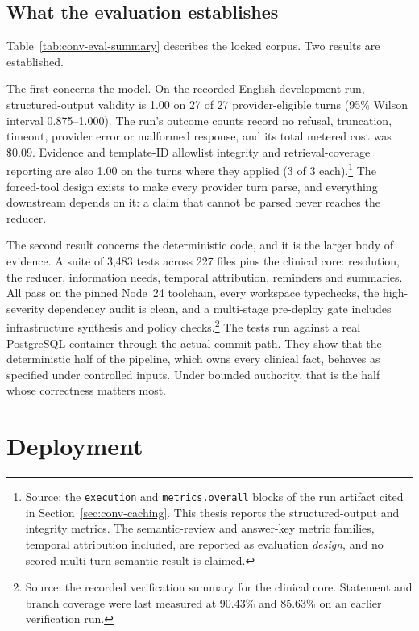 \subsection{What the evaluation establishes}

Table~\ref{tab:conv-eval-summary} describes the locked corpus. Two results are
established.


The first concerns the model. On the recorded English development run,
structured-output validity is 1.00 on 27 of 27 provider-eligible turns (95\%
Wilson interval 0.875--1.000). The run's outcome counts record no refusal,
truncation, timeout, provider error or malformed response, and its total metered
cost was \$0.09. Evidence and template-ID allowlist integrity and
retrieval-coverage reporting are also 1.00 on the turns where they applied (3 of
3 each).\footnote{Source: the \texttt{execution} and \texttt{metrics.overall}
blocks of the run artifact cited in Section~\ref{sec:conv-caching}. This
thesis reports the structured-output and integrity metrics. The semantic-review
and answer-key metric families, temporal attribution included, are reported as
evaluation \emph{design}, and no scored multi-turn semantic result is claimed.} The forced-tool design exists to make every
provider turn parse, and everything downstream depends on it: a claim that
cannot be parsed never reaches the reducer.

The second result concerns the deterministic code, and it is the larger body of
evidence. A suite of 3{,}483 tests across 227 files pins the clinical core:
resolution, the reducer, information needs, temporal attribution, reminders and
summaries. All pass on the pinned Node~24 toolchain, every workspace
typechecks, the high-severity dependency audit is clean, and a multi-stage
pre-deploy gate includes infrastructure synthesis and policy
checks.\footnote{Source: the recorded verification summary for the clinical
core. Statement and branch coverage were last measured at 90.43\% and 85.63\%
on an earlier verification run.} The tests run against a real
PostgreSQL container through the actual commit path. They show that the
deterministic half of the pipeline, which owns every clinical fact, behaves as
specified under controlled inputs. Under bounded authority, that is the half
whose correctness matters most.

\section{Deployment}
\label{sec:conv-live}

